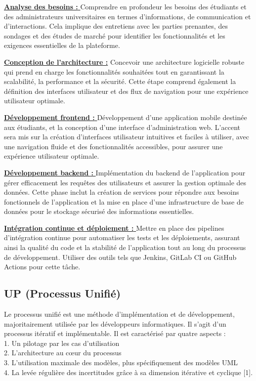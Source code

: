 \begin{sloppypar}
\underline{\textbf{Analyse des besoins : }} Comprendre en profondeur les besoins des étudiants et des administrateurs universitaires en termes d'informations, de communication et d'interactions. Cela implique des entretiens avec les parties prenantes, des sondages et des études de marché pour identifier les fonctionnalités et les exigences essentielles de la plateforme.

\underline{\textbf{Conception de l'architecture :}} Concevoir une architecture logicielle robuste qui prend en charge les fonctionnalités souhaitées tout en garantissant la scalabilité, la performance et la sécurité. Cette étape comprend également la définition des interfaces utilisateur et des flux de navigation pour une expérience utilisateur optimale.

\underline{\textbf{Développement frontend : }} Développement d'une application mobile destinée aux étudiants, et la conception d'une interface d'administration web. L'accent sera mis sur la création d'interfaces utilisateur intuitives et faciles à utiliser, avec une navigation fluide et des fonctionnalités accessibles, pour assurer une expérience utilisateur optimale.

\underline{\textbf{Développement backend : }}Implémentation du backend de l'application pour gérer efficacement les requêtes des utilisateurs et assurer la gestion optimale des données. Cette phase inclut la création de services pour répondre aux besoins fonctionnels de l'application et la mise en place d'une infrastructure de base de données pour le stockage sécurisé des informations essentielles.


\underline{\textbf{Intégration continue et déploiement : }} Mettre en place des pipelines d'intégration continue pour automatiser les tests et les déploiements, assurant ainsi la qualité du code et la stabilité de l'application tout au long du processus de développement. Utiliser des outils tels que Jenkins, GitLab CI ou GitHub Actions pour cette tâche.

\vspace{-6mm}
 \subsection{UP (Processus Unifié) }
 \vspace{-4mm}
 Le processus unifié est une méthode d’implémentation et de développement, majoritairement utilisée par les développeurs informatiques. Il s’agit d’un processus itératif et implémentable. Il est caractérisé par quatre aspects : 
\\1.	Un pilotage par les cas d’utilisation 
\\2.	L’architecture au cœur du processus
\\3.	L’utilisation maximale des modèles, plus spécifiquement des modèles UML 
\\4.	La levée régulière des incertitudes grâce à sa dimension itérative et cyclique [1].
\vspace{-6mm}

\end{sloppypar}
